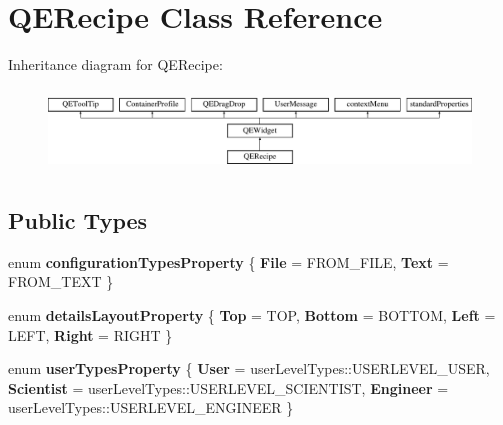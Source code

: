 \hypertarget{classQERecipe}{
\section{QERecipe Class Reference}
\label{classQERecipe}
}
Inheritance diagram for QERecipe:\begin{figure}[H]
\begin{center}
\leavevmode
\includegraphics[height=2.204725cm]{classQERecipe}
\end{center}
\end{figure}
\subsection*{Public Types}
\begin{DoxyCompactItemize}
\item 
enum {\bfseries configurationTypesProperty} \{ {\bfseries File} =  FROM\_\-FILE, 
{\bfseries Text} =  FROM\_\-TEXT
 \}
\item 
enum {\bfseries detailsLayoutProperty} \{ {\bfseries Top} =  TOP, 
{\bfseries Bottom} =  BOTTOM, 
{\bfseries Left} =  LEFT, 
{\bfseries Right} =  RIGHT
 \}
\item 
enum {\bfseries userTypesProperty} \{ {\bfseries User} =  userLevelTypes::USERLEVEL\_\-USER, 
{\bfseries Scientist} =  userLevelTypes::USERLEVEL\_\-SCIENTIST, 
{\bfseries Engineer} =  userLevelTypes::USERLEVEL\_\-ENGINEER
 \}
\end{DoxyCompactItemize}
